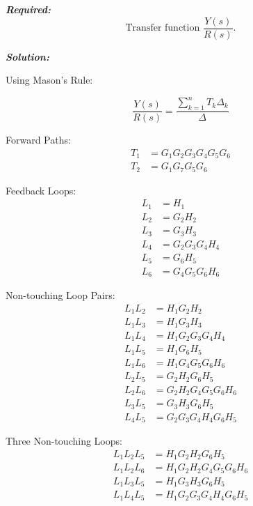 ﻿\documentclass[11pt]{article}
\begin{document}
\vspace{12pt}

\noindent\textbf{\textit{Required:}}
\[
\text{Transfer function } \frac{Y(s)}{R(s)}.
\]

\vspace{12pt}

\noindent \textbf{\textit{Solution:}}

\vspace{2pt}
{Using Mason's Rule:}

\[
\frac{Y(s)}{R(s)} = \frac{\sum_{k=1}^{n} T_k \Delta_k}{\Delta}
\]

Forward Paths:
\begin{align*}
T_1 &= G_1 G_2 G_3 G_4 G_5 G_6 \\
T_2 &= G_1 G_7 G_5 G_6
\end{align*}

\vspace{0.5em}

Feedback Loops:
\begin{align*}
L_1 &= H_1 \\
L_2 &= G_2 H_2 \\
L_3 &= G_3 H_3 \\
L_4 &= G_2 G_3 G_4 H_4 \\
L_5 &= G_6 H_5 \\
L_6 &= G_4 G_5 G_6 H_6
\end{align*}

\vspace{0.5em}

Non-touching Loop Pairs:
\begin{align*}
L_1 L_2 &= H_1 G_2 H_2 \\
L_1 L_3 &= H_1 G_3 H_3 \\
L_1 L_4 &= H_1 G_2 G_3 G_4 H_4 \\
L_1 L_5 &= H_1 G_6 H_5 \\
L_1 L_6 &= H_1 G_4 G_5 G_6 H_6 \\
L_2 L_5 &= G_2 H_2 G_6 H_5 \\
L_2 L_6 &= G_2 H_2 G_4 G_5 G_6 H_6 \\
L_3 L_5 &= G_3 H_3 G_6 H_5 \\
L_4 L_5 &= G_2 G_3 G_4 H_4 G_6 H_5
\end{align*}

\vspace{0.5em}

Three Non-touching Loops:
\begin{align*}
L_1 L_2 L_5 &= H_1 G_2 H_2 G_6 H_5 \\
L_1 L_2 L_6 &= H_1 G_2 H_2 G_4 G_5 G_6 H_6 \\
L_1 L_3 L_5 &= H_1 G_3 H_3 G_6 H_5 \\
L_1 L_4 L_5 &= H_1 G_2 G_3 G_4 H_4 G_6 H_5
\end{align*}
\end{document}
